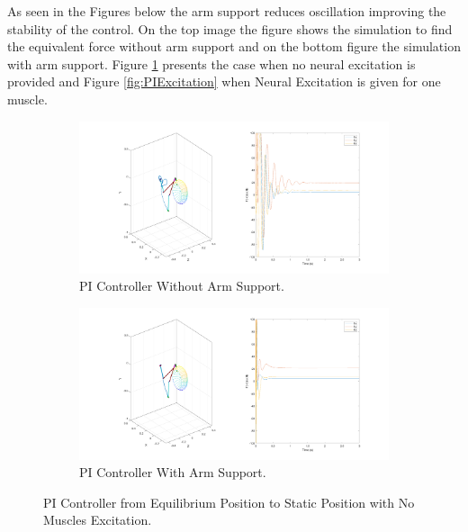 As seen in the Figures below the arm support reduces oscillation improving the stability of the control. On the top image the figure shows the simulation to find the equivalent force without arm support and on the bottom figure the simulation with arm support. Figure \ref{fig:PINoExcitation} presents the case when no neural excitation is provided and Figure \ref{fig:PIExcitation} when Neural Excitation is given for one muscle.



\begin{figure}[h!] 
    \centering
    \begin{subfigure}[b]{0.7\linewidth}
       \includegraphics[width=\linewidth]{Pictures/Results/static_without_support.png}
        \caption{PI Controller Without Arm Support.}
    \end{subfigure}

    \vspace{1cm} %
    \begin{subfigure}[b]{0.7\linewidth}            
        \includegraphics[width=\linewidth]{Pictures/Results/static_with_support.png}
        \caption{PI Controller With Arm Support.}
    \end{subfigure}

    \caption{PI Controller from Equilibrium Position to Static Position with No Muscles Excitation.}
    \label{fig:PINoExcitation}

\end{figure}


